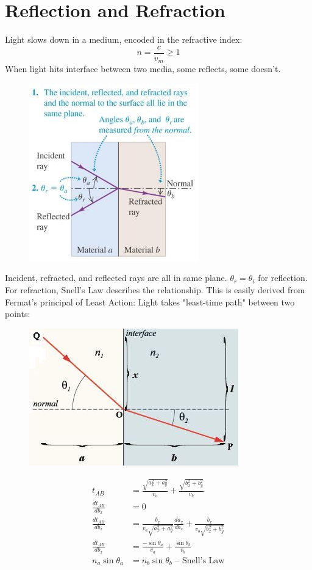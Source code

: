 \documentclass[a4paper, 11pt, normalem]{report}
\begin{document}
\section{Reflection and Refraction}
Light slows down in a medium, encoded in the refractive index:
\begin{equation}
    n = \frac{c}{v_{m}} \geq 1
\end{equation}
When light hits interface between two media, some reflects, some doesn't.
\begin{figure}[H]
    \centering
    \includegraphics[scale=0.8]{Incidence.jpg}
\end{figure}
Incident, refracted, and reflected rays are all in same plane.
$\theta_{r} = \theta_{i}$ for reflection.
For refraction, Snell's Law describes the relationship.
This is easily derived from Fermat's principal of Least Action: Light takes "least-time path" between two points:
\begin{figure}[H]
    \centering
    \includegraphics[scale=0.9]{Fermat.jpg}
\end{figure}
\begin{align}
    t_{AB} &= \frac{\sqrt{a_{x}^{2} + a_{y}^{2}}}{v_{a}} + \frac{\sqrt{b_{x}^{2} + b_{y}^{2}}}{v_{b}} \\
    \frac{dt_{AB}}{db_{x}} &= 0 \\
    \frac{dt_{AB}}{db_{x}} &= \frac{b_{x}}{v_{a}\sqrt{a_{x}^{2} + a_{y}^{2}}}\frac{da_{x}}{db_{x}} + \frac{b_{x}}{v_{b}\sqrt{b_{x}^{2} + b_{y}^{2}}} \\
    \frac{dt_{AB}}{db_{x}} &= \frac{-\sin{\theta_{a}}}{v_{a}} + \frac{\sin{\theta_{b}}}{v_{b}} \\
    n_{a}\sin{\theta_{a}} &= n_{b}\sin{\theta_{b}}\text{ -- Snell's Law}
\end{align}
\end{document}
